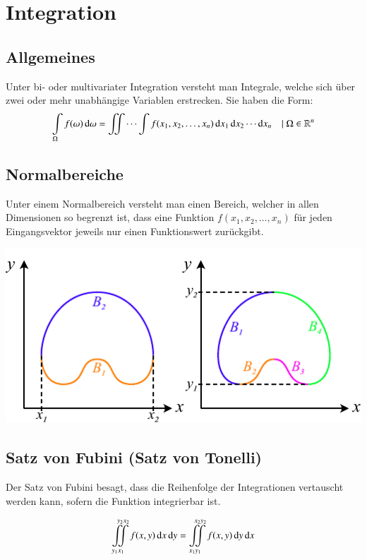 \columnbreak
\section{Integration}
\subsection{Allgemeines}
Unter bi- oder multivariater Integration versteht man Integrale, welche sich über zwei oder mehr unabhängige Variablen erstrecken.
Sie haben die Form:
\[
    \int\limits_{\Omega} f(\omega) \mathop{} \! \mathrm{d} \omega = \iint \cdots \int f(x_1, x_2, \ldots, x_n) \mathop{} \! \mathrm{d} x_1 \mathop{} \! \mathrm{d} x_2 \cdots \mathop{} \! \mathrm{d} x_n
    \quad |\; \Omega \in \mathbb{R}^n
\]

\subsection{Normalbereiche}
Unter einem Normalbereich versteht man einen Bereich, welcher in allen Dimensionen so begrenzt ist, 
dass eine Funktion $f(x_1, x_2, \ldots, x_n)$ für jeden Eingangsvektor jeweils nur einen Funktionswert zurückgibt.


\begin{center}
    \includegraphics[width=0.8\columnwidth]{images/Normalbereiche_2D.pdf}
\end{center}


\subsection{Satz von Fubini (Satz von Tonelli)}
Der Satz von Fubini besagt, dass die Reihenfolge der Integrationen vertauscht werden kann, sofern die Funktion integrierbar ist.

\[
    \iint\limits_{y_1 x_1}^{\; y_2 x_2} f(x,y)\diff x \diff y = \iint\limits_{x_1 y_1}^{\; x_2 y_2} f(x,y)\diff y \diff x%
\]



